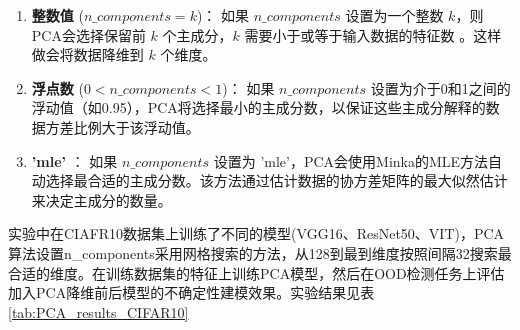 \begin{enumerate}
  \item \textbf{整数值} ($n\_components = k$)：
    如果 $n\_components$ 设置为一个整数 $k$，则PCA会选择保留前 $k$ 个主成分，$k$ 需要小于或等于输入数据的特征数 。这样做会将数据降维到 $k$ 个维度。

  \item \textbf{浮点数} ($0 < n\_components < 1$)：
    如果 $n\_components$ 设置为介于0和1之间的浮动值（如0.95），PCA将选择最小的主成分数，以保证这些主成分解释的数据方差比例大于该浮动值。
  \item \textbf{'mle'} ：
    如果 $n\_components$ 设置为 'mle'，PCA会使用Minka的MLE方法自动选择最合适的主成分数。该方法通过估计数据的协方差矩阵的最大似然估计来决定主成分的数量。


\end{enumerate}

实验中在CIAFR10数据集上训练了不同的模型(VGG16、ResNet50、VIT)，PCA算法设置n\_components采用网格搜索的方法，从128到最到维度按照间隔32搜索最合适的维度。在训练数据集的特征上训练PCA模型，然后在OOD检测任务上评估加入PCA降维前后模型的不确定性建模效果。实验结果见表\ref{tab:PCA_results_CIFAR10}
\begin{table}[h]
    \captionsetup{font=small, justification=centering}
    \centering
    \renewcommand{\arraystretch}{1.0} %
    \caption{数据集选择CIFAR10，在不同的模型(VGG16,ResNet50,VIT)上做训练，对比联合训练和联合训练+PCA降维对模型不确定性的建模效果，报告指标是AUROC($\uparrow$) / AUPRC($\uparrow$)}
    \label{tab:PCA_results_CIFAR10}
\end{table}

